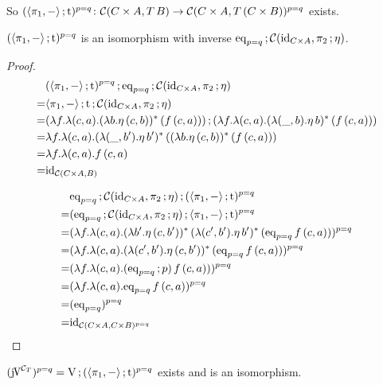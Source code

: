 \documentclass[runningheads,envcountsame]{llncs}
\begin{document}
So $(\comp{\langle \pi_1, - \rangle}{\mstrength})^{p=q}\colon \homC{C \times A}{T\,B} \to \homC{C \times A}{T\,(C \times B)}^{p=q}$ exists.

\begin{lemma}
    $(\comp{\langle \pi_1, - \rangle}{\mstrength})^{p=q}$ is an isomorphism with inverse $\comp{\mathrm{eq}_{p=q}}{\homC{\id_{C \times A}}{\comp{\pi_2}{\munit}}}$.
\end{lemma}
\begin{proof}
    \begin{align}
        & \comp{(\comp{\langle \pi_1, - \rangle}{\mstrength})^{p=q}}{\comp{\mathrm{eq}_{p=q}}{\homC{\id_{C \times A}}{\comp{\pi_2}{\munit}}}} \\
      = & \comp{\comp{\langle \pi_1, - \rangle}{\mstrength}}{\homC{\id_{C \times A}}{\comp{\pi_2}{\munit}}} \\
      = & \comp{(\lambda f. \lambda (c, a). (\lambda b. \munit\,(c, b))^*\,(f\,(c, a)))}{(\lambda f. \lambda (c, a). (\lambda (\_, b). \munit\,b)^*\,(f\,(c, a)))} \\
      = & \lambda f. \lambda (c, a). (\lambda (\_, b'). \munit\,b')^*\,((\lambda b. \munit\,(c, b))^*\,(f\,(c, a))) \\
      = & \lambda f. \lambda (c, a). f\,(c, a) \\
      = & \id_{\homC{C \times A}{B}}
    \end{align}
    
    \begin{align}
        & \comp{\comp{\mathrm{eq}_{p=q}}{\homC{\id_{C \times A}}{\comp{\pi_2}{\munit}}}}{(\comp{\langle \pi_1, - \rangle}{\mstrength})^{p=q}} \\
      = & (\comp{\mathrm{eq}_{p=q}}{\comp{\homC{\id_{C \times A}}{\comp{\pi_2}{\munit}}}{\comp{\langle \pi_1, - \rangle}{\mstrength}}})^{p=q} \\
      = & (\lambda f. \lambda (c, a). (\lambda b'. \munit\,(c, b'))^*\,(\lambda (c', b'). \munit\,b')^*\,(\mathrm{eq}_{p=q}\,f\,(c, a)))^{p=q} \\
      = & (\lambda f. \lambda (c, a). (\lambda (c', b'). \munit\,(c, b'))^*\,(\mathrm{eq}_{p=q}\,f\,(c, a)))^{p=q} \\
      = & (\lambda f. \lambda (c, a). (\comp{\mathrm{eq}_{p=q}}{p})\,f\,(c, a)))^{p=q} \\
      = & (\lambda f. \lambda (c, a).\mathrm{eq}_{p=q}\,f\,(c, a))^{p=q} \\
      = & (\mathrm{eq}_{p=q})^{p=q} \\
      = & \id_{\homC{C \times A}{C \times B}^{p=q}}
    \end{align}
\end{proof}
\begin{corollary}
    $(\juncurry[\C_T])^{p=q} = \comp{\uncurry}{(\comp{\langle \pi_1, - \rangle}{\mstrength}})^{p=q}$ exists and is an isomorphism.
\end{corollary}
\end{document}
